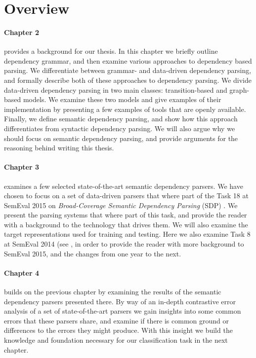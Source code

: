 \section{Overview} 

\paragraph{Chapter 2} provides a background for our thesis. In this chapter we briefly outline dependency grammar, and then examine various approaches to dependency based parsing. We differentiate between grammar- and data-driven dependency parsing, and formally describe both of these approaches to dependency parsing. We divide data-driven dependency parsing in two main classes: transition-based and graph-based models. We examine these two models and give examples of their implementation by presenting a few examples of tools that are openly available. Finally, we define semantic dependency parsing, and show how this approach differentiates from syntactic dependency parsing. We will also argue why we should focus on semantic dependency parsing, and provide arguments for the reasoning behind writing this thesis.

\paragraph{Chapter 3} examines a few selected state-of-the-art semantic dependency parsers. We have chosen to focus on a set of data-driven parsers that where part of the Task 18 at SemEval 2015 on \textit{Broad-Coverage Semantic Dependency Parsing} (SDP) \cite{Oepen:15}. We present the parsing systems that where part of this task, and provide the reader with a background to the technology that drives them. We will also examine the target representations used for training and testing. Here we also examine Task 8 at SemEval 2014 (see , in order to provide the reader with more background to SemEval 2015, and the changes from one year to the next.

\paragraph{Chapter 4} builds on the previous chapter by examining the results of the semantic dependency parsers presented there. By way of an in-depth contrastive error analysis of a set of state-of-the-art parsers we gain insights into some common errors that these parsers share, and examine if there is common ground or differences to the errors they might produce. With this insight we build the knowledge and foundation necessary for our classification task in the next chapter. 

